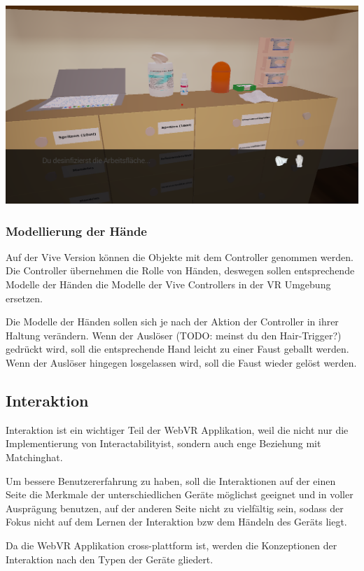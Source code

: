    \includegraphics[width=\textwidth]{images/Schritt_4_2.png}

   \subsubsection{Modellierung der Hände}
   Auf der Vive Version können die Objekte mit dem Controller genommen werden. Die Controller übernehmen die Rolle von Händen, deswegen sollen entsprechende Modelle der Händen die Modelle der Vive Controllers in der VR Umgebung ersetzen.
   
   Die Modelle der Händen sollen sich je nach der Aktion der Controller in ihrer Haltung verändern. Wenn der Auslöser (TODO: meinst du den Hair-Trigger?) gedrückt wird, soll die entsprechende Hand leicht zu einer Faust geballt werden. Wenn der Auslöser hingegen losgelassen wird, soll die Faust wieder gelöst werden.

 \subsection{Interaktion}
 Interaktion ist ein wichtiger Teil der WebVR Applikation, weil die nicht nur die Implementierung von \glqq Interactability\grqq ist, sondern auch enge Beziehung mit \glqq Matching\grqq hat.
 
 Um bessere Benutzererfahrung zu haben, soll die Interaktionen auf der einen Seite die Merkmale der unterschiedlichen Geräte möglichst geeignet und in voller Ausprägung benutzen, auf der anderen Seite nicht zu vielfältig sein, sodass der Fokus nicht auf dem Lernen der Interaktion bzw dem Händeln des Geräts liegt. 
 
 Da die WebVR Applikation cross-plattform ist, werden die Konzeptionen der Interaktion nach den Typen der Geräte gliedert.

